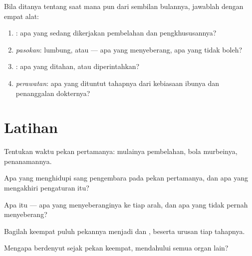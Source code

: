 \begin{method}\label{met:g8:from-egg-to-birth:explain}
Bila ditanya tentang saat mana pun dari sembilan bulannya,
jawablah dengan empat alat:
\begin{enumerate}
  \item \emph{}: apa yang sedang dikerjakan pembelahan
        dan pengkhususannya?
  \item \emph{pasokan}: lumbung, atau  --- apa yang
        menyeberang, apa yang tidak boleh?
  \item \emph{}: apa yang ditahan, atau diperintahkan?
  \item \emph{perawatan}: apa yang dituntut tahapnya dari
        kebiasaan ibunya dan penanggalan dokternya?
\end{enumerate}
\end{method}

\section{Latihan}

\begin{exercise}[$\star$]\label{exo:g8:from-egg-to-birth:1}
Tentukan waktu pekan pertamanya: mulainya pembelahan, bola
murbeinya, penanamannya.
\end{exercise}

\begin{exercise}[$\star$]\label{exo:g8:from-egg-to-birth:2}
Apa yang menghidupi sang pengembara pada pekan pertamanya,
dan apa yang mengakhiri pengaturan itu?
\end{exercise}

\begin{exercise}[$\star$]\label{exo:g8:from-egg-to-birth:3}
Apa itu  --- apa yang menyeberanginya ke tiap arah,
dan apa yang tidak pernah menyeberang?
\end{exercise}

\begin{exercise}[$\star$]\label{exo:g8:from-egg-to-birth:4}
Bagilah keempat puluh pekannya menjadi  dan ,
beserta urusan tiap tahapnya.
\end{exercise}

\begin{exercise}[$\star$]\label{exo:g8:from-egg-to-birth:5}
Mengapa  berdenyut sejak pekan keempat,
mendahului semua organ lain?
\end{exercise}

